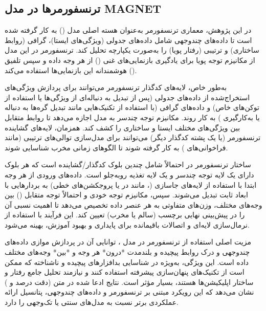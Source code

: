 \subsection{ترنسفورمرها در مدل MAGNET}
در این پژوهش، معماری ترنسفورمر به‌عنوان هسته اصلی مدل  () به کار گرفته شده است تا داده‌های چندوجهی شامل داده‌های جدولی (ویژگی‌های ایستا)، گرافی (روابط ساختاری) و ترتیبی (رفتار پویا) را به‌صورت یکپارچه تحلیل کند. ترنسفورمر در این مدل از مکانیزم توجه پویا برای یادگیری بازنمایی‌های غنی () از هر وجه داده و سپس تلفیق () هوشمندانه این بازنمایی‌ها استفاده می‌کند.

به‌طور خاص، لایه‌های کدگذار ترنسفورمر می‌توانند برای پردازش ویژگی‌های استخراج‌شده از داده‌های جدولی (پس از تبدیل به دنباله‌ای از ویژگی‌ها یا استفاده از توکن‌های خاص) و داده‌های گرافی (با استفاده از تکنیک‌هایی مانند تبدیل گره‌ها به دنباله یا به‌کارگیری ) به کار روند. مکانیزم توجه چندسر به مدل اجازه می‌دهد تا روابط متقابل بین ویژگی‌های مختلف ایستا و ساختاری را کشف کند. همزمان، لایه‌های گشاینده ترنسفورمر (یا یک پشته کدگذار دیگر) می‌توانند برای مدل‌سازی توالی‌های ترتیبی (مانند فراخوانی‌های ) به کار گرفته شوند تا الگوهای زمانی مخرب شناسایی شوند.

ساختار ترنسفورمر در  احتمالاً شامل چندین بلوک کدگذار/گشاینده است که هر بلوک دارای یک لایه توجه چندسر و یک لایه تغذیه روبه‌جلو است. داده‌های ورودی از هر وجه ابتدا با استفاده از لایه‌های جاسازی (، مانند  در  یا پروجکشن‌های خطی) به بردارهایی با ابعاد ثابت تبدیل می‌شوند. سپس، مکانیزم توجه خودی و احتمالاً توجه متقابل () بین وجه‌های مختلف، وزن‌های متفاوتی به هر عنصر داده تخصیص می‌دهد تا اهمیت نسبی آن را در پیش‌بینی نهایی برچسب (سالم یا مخرب) تعیین کند. این فرآیند با استفاده از نرمال‌سازی لایه‌ای و اتصالات باقیمانده برای پایداری و بهبود آموزش، بهینه می‌شود.

مزیت اصلی استفاده از ترنسفورمر در مدل ، توانایی آن در پردازش موازی داده‌های چندوجهی و درک روابط پیچیده و بلندمدت *درون* هر وجه و *بین* وجه‌های مختلف داده است. این ویژگی، به‌ویژه در شناسایی بدافزارهای پیچیده و ناشناخته که ممکن است از تکنیک‌های پنهان‌سازی پیشرفته استفاده کنند و نیازمند تحلیل جامع رفتار و ساختار اپلیکیشن‌ها هستند، بسیار مؤثر است. نتایج ادعا شده در متن (دقت  درصد و  ) نشان می‌دهد که این رویکرد مبتنی بر ترنسفورمر و داده‌های چندوجهی، پتانسیل ارائه عملکردی برتر نسبت به مدل‌های سنتی یا تک‌وجهی را دارد.

